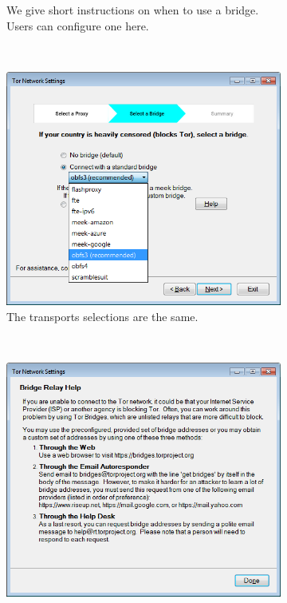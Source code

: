 \documentclass[USenglish,oneside,twocolumn]{article}
\begin{document}
\begin{figure}
\begin{subfigure}[b]{0.30\textwidth}
	\centering\captionsetup{width=1.5\linewidth}%
	\caption{We give short instructions on when to use a bridge. Users can configure one here.}
	\label{fig:new-bridge}
\end{subfigure}
~~~~~~~~~~
\begin{subfigure}[b]{0.30\textwidth}
	\includegraphics[width=\textwidth]{screenshots/NEW-bridgeSettings-combobox.png}
	\centering\captionsetup{width=1.5\linewidth}%
	\caption{The transports selections are the same.}
	\label{fig:new-bridge-combobox}
\end{subfigure}
~~~~~~~~~~~~~~~~~~~~~~~~~
\begin{subfigure}[b]{0.30\textwidth}
	\includegraphics[width=\textwidth]{screenshots/NEW-bridgeHelp.png}

\end{subfigure}
\end{figure}
\end{document}
